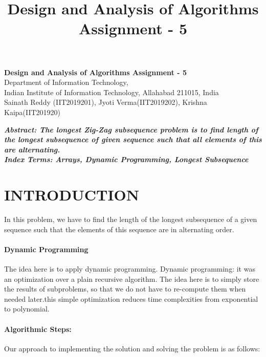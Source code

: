 \documentclass[10pt]{article}
\author{}
\title{\Large{Design and Analysis of Algorithms Assignment - 5}}
\begin{document}
	
	\begin{center}
		{\Large \textbf{Design and Analysis of Algorithms Assignment - 5}}\\
		\vspace{1em}
		{\large Department of Information Technology,}\\
		\vspace{1em}
		\large{Indian Institute of Information Technology, Allahabad 211015, India}\\
		\vspace{1em}
		\large{Sainath Reddy (IIT2019201), Jyoti Verma(IIT2019202), Krishna Kaipa(IIT201920)}
		\vspace{2.5em}
		
	\end{center}
	
\begin{multicols*}{2}

    \textbf{\emph{{Abstract}: The longest Zig-Zag subsequence problem is to find length of the longest subsequence of given sequence such that all elements of this are alternating.}}\\
	
	\textbf{\emph{{Index Terms}: Arrays, Dynamic Programming, Longest Subsequence}}

\section*{INTRODUCTION}
 
In this problem, we have to find the length of the longest subsequence of a given sequence such that the elements of this sequence are in alternating order.

\paragraph{Dynamic Programming}
The idea here is to apply dynamic programming. Dynamic programming: it was an optimization over a plain recursive algorithm. The idea here is to simply store the results of subproblems, so that we do not have to re-compute them when needed later.this simple optimization reduces time complexities from exponential to polynomial.


\paragraph{Algorithmic Steps:}

Our approach to implementing the solution and solving the problem is as follows:
\begin{enumerate}


\end{enumerate}
\end{multicols*}
\end{document}
